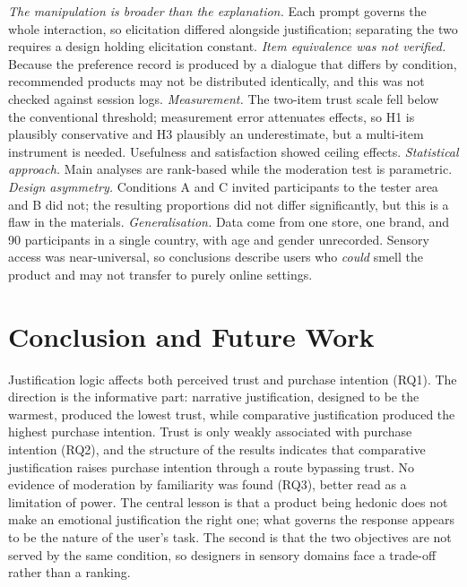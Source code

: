 \documentclass[conference]{IEEEtran}
\begin{document}
\textit{The manipulation is broader than the explanation.} Each prompt governs the whole
interaction, so elicitation differed alongside justification; separating the two requires a
design holding elicitation constant. \textit{Item equivalence was not verified.} Because
the preference record is produced by a dialogue that differs by condition, recommended
products may not be distributed identically, and this was not checked against session logs.
\textit{Measurement.} The two-item trust scale fell below the conventional threshold;
measurement error attenuates effects, so H1 is plausibly conservative and H3 plausibly an
underestimate, but a multi-item instrument is needed. Usefulness and satisfaction showed
ceiling effects. \textit{Statistical approach.} Main analyses are rank-based while the
moderation test is parametric. \textit{Design asymmetry.} Conditions A and C invited
participants to the tester area and B did not; the resulting proportions did not differ
significantly, but this is a flaw in the materials. \textit{Generalisation.} Data come from
one store, one brand, and 90 participants in a single country, with age and gender
unrecorded. Sensory access was near-universal, so conclusions describe users who
\textit{could} smell the product and may not transfer to purely online settings.

\section{Conclusion and Future Work}
\label{sec:conclusion}

Justification logic affects both perceived trust and purchase intention (RQ1). The
direction is the informative part: narrative justification, designed to be the warmest,
produced the lowest trust, while comparative justification produced the highest purchase
intention. Trust is only weakly associated with purchase intention (RQ2), and the structure
of the results indicates that comparative justification raises purchase intention through a
route bypassing trust. No evidence of moderation by familiarity was found (RQ3), better
read as a limitation of power. The central lesson is that a product being hedonic does not
make an emotional justification the right one; what governs the response appears to be the
nature of the user's task. The second is that the two objectives are not served by the same
condition, so designers in sensory domains face a trade-off rather than a ranking.
\end{document}
